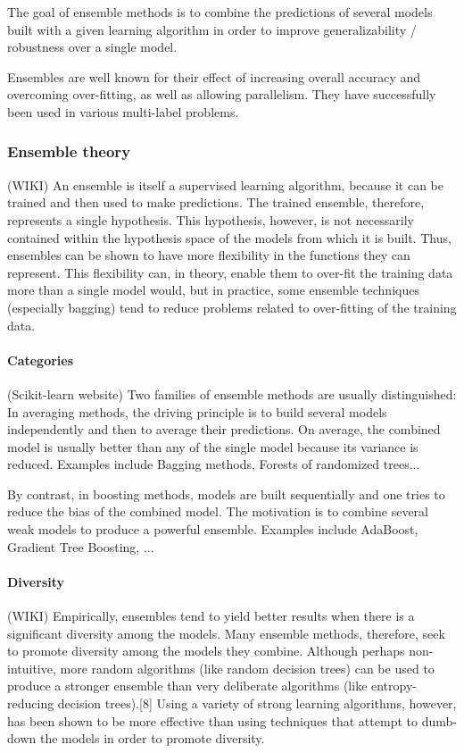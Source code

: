 The goal of ensemble methods is to combine the predictions of several models built with a given learning algorithm in order to improve generalizability / robustness over a single model.

Ensembles are well known for their eﬀect of increasing overall accuracy and
overcoming over-ﬁtting, as well as allowing parallelism. They have successfully
been used in various multi-label problems.

\subsubsection{Ensemble theory}

(WIKI) An ensemble is itself a supervised learning algorithm, because it can be trained and then used to make predictions. The trained ensemble, therefore, represents a single hypothesis. This hypothesis, however, is not necessarily contained within the hypothesis space of the models from which it is built. Thus, ensembles can be shown to have more flexibility in the functions they can represent. This flexibility can, in theory, enable them to over-fit the training data more than a single model would, but in practice, some ensemble techniques (especially bagging) tend to reduce problems related to over-fitting of the training data.

\paragraph{Categories}

(Scikit-learn website) Two families of ensemble methods are usually distinguished:
In averaging methods, the driving principle is to build several models independently and then to average their predictions. On average, the combined model is usually better than any of the single model because its variance is reduced. Examples include Bagging methods, Forests of randomized trees...

By contrast, in boosting methods, models are built sequentially and one tries to reduce the bias of the combined model. The motivation is to combine several weak models to produce a powerful ensemble. Examples include AdaBoost, Gradient Tree Boosting, ...


\paragraph{Diversity}

(WIKI) Empirically, ensembles tend to yield better results when there is a significant diversity among the models. Many ensemble methods, therefore, seek to promote diversity among the models they combine. Although perhaps non-intuitive, more random algorithms (like random decision trees) can be used to produce a stronger ensemble than very deliberate algorithms (like entropy-reducing decision trees).[8] Using a variety of strong learning algorithms, however, has been shown to be more effective than using techniques that attempt to dumb-down the models in order to promote diversity.


